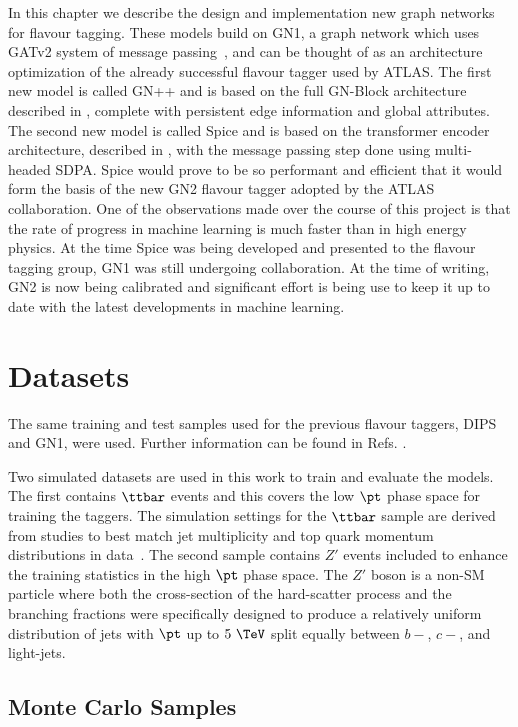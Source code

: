In this chapter we describe the design and implementation new graph networks for flavour tagging.
These models build on GN1, a graph network which uses GATv2 system of message passing~\cite{GATv2}, and can be thought of as an architecture optimization of the already successful flavour tagger used by ATLAS.
The first new model is called GN++ and is based on the full GN-Block architecture described in , complete with persistent edge information and global attributes.
The second new model is called Spice and is based on the transformer encoder architecture, described in , with the message passing step done using multi-headed SDPA.
Spice would prove to be so performant and efficient that it would form the basis of the new GN2 flavour tagger adopted by the ATLAS collaboration.
One of the observations made over the course of this project is that the rate of progress in machine learning is much faster than in high energy physics.
At the time Spice was being developed and presented to the flavour tagging group, GN1 was still undergoing collaboration.
At the time of writing, GN2 is now being calibrated and significant effort is being use to keep it up to date with the latest developments in machine learning.

\section{Datasets}

The same training and test samples used for the previous flavour taggers, DIPS and GN1, were used.
Further information can be found in Refs. \cite{GN1, AlexThesis}.

Two simulated datasets are used in this work to train and evaluate the models.
The first contains $\ttbar$ events and this covers the low $\pt$ phase space for training the taggers.
The simulation settings for the $\ttbar$ sample are derived from studies to best match jet multiplicity and top quark momentum distributions in data~\cite{ttbar1, ttbar2}.
The second sample contains $Z'$ events included to enhance the training statistics in the high $\pt$ phase space.
The $Z'$ boson is a non-SM particle where both the cross-section of the hard-scatter process and the branching fractions were specifically designed to produce a relatively uniform distribution of jets with $\pt$ up to $5~\TeV$ split equally between $b-$, $c-$, and light-jets.

\subsection{Monte Carlo Samples}

